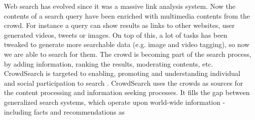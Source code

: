 Web search has evolved since it was a massive link analysis system. Now the
contents of a search query have been enriched with multimedia contents from the
crowd. For instance a query can show results as links to other websites,
user generated videos, tweets or images. On top of this, a lot of tasks has been
tweaked to generate more searchable data (e.g. image and video tagging), so now
we are able to search for them. The crowd is becoming part of the search process,
by adding information, ranking the results, moderating contents, etc.\\

CrowdSearch is targeted to enabling, promoting and understanding individual
and social participation to search \cite{fraternali2012crowdsearch}.
CrowdSearch uses the crowds as sources for the content processing and information
seeking processes. It fills the gap between generalized search systems, which
operate upon world-wide information - including facts and recommendations as
